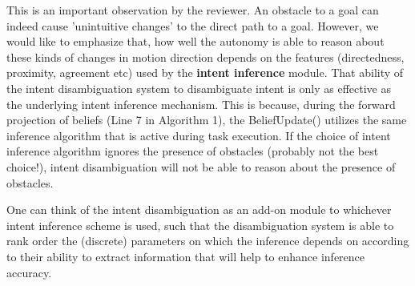 \documentclass[a4paper,twoside,11pt]{reviewresponse}
\begin{document}

This is an important observation by the reviewer. An obstacle to a goal can indeed cause 'unintuitive changes' to the direct path to a goal. However, we would like to emphasize that, how well the autonomy is able to reason about these kinds of changes in motion direction depends on the features (directedness, proximity, agreement etc) used by the \textbf{intent inference} module. That ability of the intent disambiguation system to disambiguate intent is only as effective as the underlying intent inference mechanism. This is because, during the forward projection of beliefs (Line 7 in Algorithm 1), the BeliefUpdate() utilizes the same inference algorithm that is active during task execution. If the choice of intent inference algorithm ignores the presence of obstacles (probably not the best choice!), intent disambiguation will not be able to reason about the presence of obstacles. 

One can think of the intent disambiguation as an add-on module to whichever intent inference scheme is used, such that the disambiguation system is able to rank order the (discrete) parameters on which the inference depends on according to their ability to extract information that will help to enhance inference accuracy.


\end{document}
